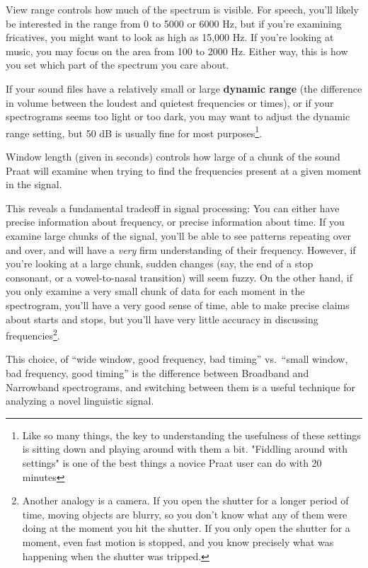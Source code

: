 \documentclass[11pt]{article}
\begin{document}
View range controls how much of the spectrum is visible. For speech,
you'll likely be interested in the range from 0 to 5000 or 6000 Hz, but
if you're examining fricatives, you might want to look as high as 15,000
Hz. If you're looking at music, you may focus on the area from 100 to
2000 Hz. Either way, this is how you set which part of the spectrum you
care about.

If your sound files have a relatively small or large \textbf{dynamic
range} (the difference in volume between the loudest and quietest
frequencies or times), or if your spectrograms seems too light or too
dark, you may want to adjust the dynamic range setting, but 50 dB is
usually fine for most
purposes\footnote{Like so many things, the key to understanding the usefulness of these settings is sitting down and playing around with them a bit.  "Fiddling around with settings" is one of the best things a novice Praat user can do with 20 minutes}.

Window length (given in seconds) controls how large of a chunk of the
sound Praat will examine when trying to find the frequencies present at
a given moment in the signal.

This reveals a fundamental tradeoff in signal processing: You can either
have precise information about frequency, or precise information about
time. If you examine large chunks of the signal, you'll be able to see
patterns repeating over and over, and will have a \emph{very} firm
understanding of their frequency. However, if you're looking at a large
chunk, sudden changes (say, the end of a stop consonant, or a
vowel-to-nasal transition) will seem fuzzy. On the other hand, if you
only examine a very small chunk of data for each moment in the
spectrogram, you'll have a very good sense of time, able to make precise
claims about starts and stops, but you'll have very little accuracy in
discussing
frequencies\footnote{Another analogy is a camera.  If you open the shutter for a longer period of time, moving objects are blurry, so you don't know what any of them were doing at the moment you hit the shutter.  If you only open the shutter for a moment, even fast motion is stopped, and you know precisely what was happening when the shutter was tripped.}.

This choice, of ``wide window, good frequency, bad timing'' vs.~``small
window, bad frequency, good timing'' is the difference between Broadband
and Narrowband spectrograms, and switching between them is a useful
technique for analyzing a novel linguistic signal.
\end{document}
